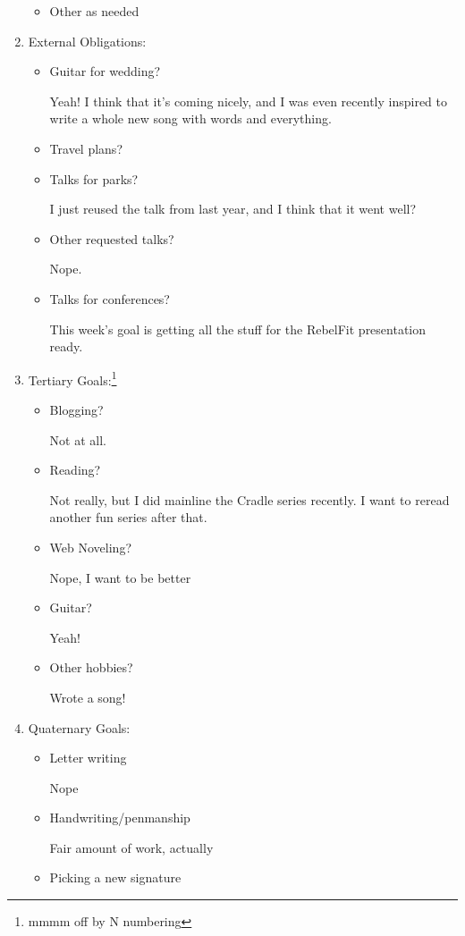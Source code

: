 \documentclass[12pt]{article}
\renewcommand{\,}{\textsuperscript{,}}
\begin{document}
\begin{enumerate}
\begin{itemize}
\item Other as needed

\end{itemize}

\item External Obligations:

\begin{itemize}

\item Guitar for wedding?

Yeah! I think that it's coming nicely, and I was even recently inspired to write a whole new song with words and everything.

\item Travel plans?

\item Talks for parks?

I just reused the talk from last year, and I think that it went well?

\item Other requested talks?

Nope.

\item Talks for conferences?

This week's goal is getting all the stuff for the RebelFit presentation ready.

\end{itemize}

\item Tertiary Goals:\footnote{mmmm off by N numbering}

\begin{itemize}

\item Blogging?

Not at all.

\item Reading?

Not really, but I did mainline the Cradle series recently. I want to reread another fun series after that.

\item Web Noveling?

Nope, I want to be better

\item Guitar?

Yeah!

\item Other hobbies?

Wrote a song!

\end{itemize}

\item Quaternary Goals:

\begin{itemize}

\item Letter writing

Nope

\item Handwriting/penmanship

Fair amount of work, actually

\item Picking a new signature

\end{itemize}

\end{enumerate}
\end{document}
